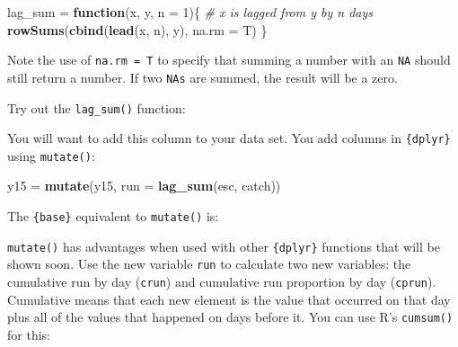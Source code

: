 \documentclass[]{book}
\newenvironment{Shaded}{\begin{snugshade}}{\end{snugshade}}
\newcommand{\KeywordTok}[1]{\textcolor[rgb]{0.13,0.29,0.53}{\textbf{#1}}}
\newcommand{\DataTypeTok}[1]{\textcolor[rgb]{0.13,0.29,0.53}{#1}}
\newcommand{\DecValTok}[1]{\textcolor[rgb]{0.00,0.00,0.81}{#1}}
\newcommand{\StringTok}[1]{\textcolor[rgb]{0.31,0.60,0.02}{#1}}
\newcommand{\CommentTok}[1]{\textcolor[rgb]{0.56,0.35,0.01}{\textit{#1}}}
\newcommand{\ControlFlowTok}[1]{\textcolor[rgb]{0.13,0.29,0.53}{\textbf{#1}}}
\newcommand{\OperatorTok}[1]{\textcolor[rgb]{0.81,0.36,0.00}{\textbf{#1}}}
\newcommand{\NormalTok}[1]{#1}
\theoremstyle{definition}
\theoremstyle{definition}
\theoremstyle{definition}
\theoremstyle{remark}
\begin{document}
\begin{Shaded}
\begin{Highlighting}[]
\NormalTok{lag_sum =}\StringTok{ }\ControlFlowTok{function}\NormalTok{(x, y, }\DataTypeTok{n =} \DecValTok{1}\NormalTok{)\{}
  \CommentTok{# x is lagged from y by n days}
  \KeywordTok{rowSums}\NormalTok{(}\KeywordTok{cbind}\NormalTok{(}\KeywordTok{lead}\NormalTok{(x, n), y), }\DataTypeTok{na.rm =}\NormalTok{ T)}
\NormalTok{\}}
\end{Highlighting}
\end{Shaded}

Note the use of \texttt{na.rm\ =\ T} to specify that summing a number
with an \texttt{NA} should still return a number. If two \texttt{NAs}
are summed, the result will be a zero.

Try out the \texttt{lag\_sum()} function:

\begin{Shaded}
\end{Shaded}

You will want to add this column to your data set. You add columns in
\texttt{\{dplyr\}} using \texttt{mutate()}:

\begin{Shaded}
\begin{Highlighting}[]
\NormalTok{y15 =}\StringTok{ }\KeywordTok{mutate}\NormalTok{(y15, }\DataTypeTok{run =} \KeywordTok{lag_sum}\NormalTok{(esc, catch))}
\end{Highlighting}
\end{Shaded}

The \texttt{\{base\}} equivalent to \texttt{mutate()} is:

\begin{Shaded}
\end{Shaded}

\texttt{mutate()} has advantages when used with other \texttt{\{dplyr\}}
functions that will be shown soon. Use the new variable \texttt{run} to
calculate two new variables: the cumulative run by day (\texttt{crun})
and cumulative run proportion by day (\texttt{cprun}). Cumulative means
that each new element is the value that occurred on that day plus all of
the values that happened on days before it. You can use R's
\texttt{cumsum()} for this:
\end{document}
